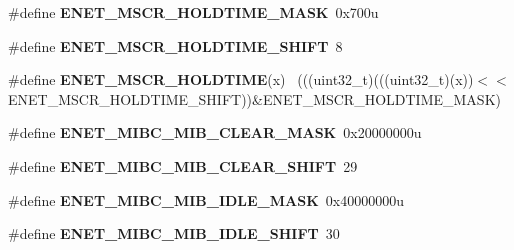 \begin{DoxyCompactItemize}
\item 
\hypertarget{group___e_n_e_t___register___masks_gaf0be3bf4ebe6e922406c96f80faf3481}{}\#define {\bfseries E\+N\+E\+T\+\_\+\+M\+S\+C\+R\+\_\+\+H\+O\+L\+D\+T\+I\+M\+E\+\_\+\+M\+A\+S\+K}~0x700u\label{group___e_n_e_t___register___masks_gaf0be3bf4ebe6e922406c96f80faf3481}

\item 
\hypertarget{group___e_n_e_t___register___masks_ga78800fa8f2240e5d4c1ce06aa39a822e}{}\#define {\bfseries E\+N\+E\+T\+\_\+\+M\+S\+C\+R\+\_\+\+H\+O\+L\+D\+T\+I\+M\+E\+\_\+\+S\+H\+I\+F\+T}~8\label{group___e_n_e_t___register___masks_ga78800fa8f2240e5d4c1ce06aa39a822e}

\item 
\hypertarget{group___e_n_e_t___register___masks_ga69600c691645f18d11430836f399fc31}{}\#define {\bfseries E\+N\+E\+T\+\_\+\+M\+S\+C\+R\+\_\+\+H\+O\+L\+D\+T\+I\+M\+E}(x)                                    ~(((uint32\+\_\+t)(((uint32\+\_\+t)(x))$<$$<$E\+N\+E\+T\+\_\+\+M\+S\+C\+R\+\_\+\+H\+O\+L\+D\+T\+I\+M\+E\+\_\+\+S\+H\+I\+F\+T))\&E\+N\+E\+T\+\_\+\+M\+S\+C\+R\+\_\+\+H\+O\+L\+D\+T\+I\+M\+E\+\_\+\+M\+A\+S\+K)\label{group___e_n_e_t___register___masks_ga69600c691645f18d11430836f399fc31}

\item 
\hypertarget{group___e_n_e_t___register___masks_gaeab1ad7fdf634ff335c571ce0fcdbb71}{}\#define {\bfseries E\+N\+E\+T\+\_\+\+M\+I\+B\+C\+\_\+\+M\+I\+B\+\_\+\+C\+L\+E\+A\+R\+\_\+\+M\+A\+S\+K}~0x20000000u\label{group___e_n_e_t___register___masks_gaeab1ad7fdf634ff335c571ce0fcdbb71}

\item 
\hypertarget{group___e_n_e_t___register___masks_ga8bea19b7c620aa6b2af56b9d71da03b6}{}\#define {\bfseries E\+N\+E\+T\+\_\+\+M\+I\+B\+C\+\_\+\+M\+I\+B\+\_\+\+C\+L\+E\+A\+R\+\_\+\+S\+H\+I\+F\+T}~29\label{group___e_n_e_t___register___masks_ga8bea19b7c620aa6b2af56b9d71da03b6}

\item 
\hypertarget{group___e_n_e_t___register___masks_ga780d8649845f0cce4e56318e194df98c}{}\#define {\bfseries E\+N\+E\+T\+\_\+\+M\+I\+B\+C\+\_\+\+M\+I\+B\+\_\+\+I\+D\+L\+E\+\_\+\+M\+A\+S\+K}~0x40000000u\label{group___e_n_e_t___register___masks_ga780d8649845f0cce4e56318e194df98c}

\item 
\hypertarget{group___e_n_e_t___register___masks_gaae8f76b07c6b9f2fc82ebad5baacc2a7}{}\#define {\bfseries E\+N\+E\+T\+\_\+\+M\+I\+B\+C\+\_\+\+M\+I\+B\+\_\+\+I\+D\+L\+E\+\_\+\+S\+H\+I\+F\+T}~30\label{group___e_n_e_t___register___masks_gaae8f76b07c6b9f2fc82ebad5baacc2a7}


\end{DoxyCompactItemize}
